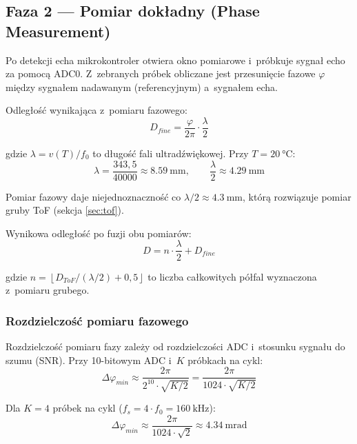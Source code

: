 \documentclass[a4paper,11pt]{article}
\begin{document}
\subsection{Faza 2 --- Pomiar dokładny (Phase Measurement)}
\label{sec:phase}

Po detekcji echa mikrokontroler otwiera okno pomiarowe i~próbkuje sygnał
echo za pomocą ADC0. Z~zebranych próbek obliczane jest przesunięcie fazowe
$\varphi$ między sygnałem nadawanym (referencyjnym) a~sygnałem echa.

Odległość wynikająca z~pomiaru fazowego:
\begin{equation}
    D_{fine} = \frac{\varphi}{2\pi} \cdot \frac{\lambda}{2}
    \label{eq:phase}
\end{equation}

gdzie $\lambda = v(T) / f_0$ to długość fali ultradźwiękowej. Przy
$T = \SI{20}{\celsius}$:
\begin{equation}
    \lambda = \frac{343{,}5}{40000} \approx \SI{8,59}{\milli\metre}, \qquad
    \frac{\lambda}{2} \approx \SI{4,29}{\milli\metre}
    \label{eq:lambda}
\end{equation}

Pomiar fazowy daje niejednoznaczność co $\lambda/2 \approx \SI{4,3}{\milli\metre}$,
którą rozwiązuje pomiar gruby ToF (sekcja \ref{sec:tof}).

Wynikowa odległość po fuzji obu pomiarów:
\begin{equation}
    \boxed{D = n \cdot \frac{\lambda}{2} + D_{fine}}
    \label{eq:wynik}
\end{equation}

gdzie $n = \left\lfloor D_{ToF} / (\lambda/2) + 0{,}5 \right\rfloor$ to liczba
całkowitych półfal wyznaczona z~pomiaru grubego.

\subsubsection{Rozdzielczość pomiaru fazowego}

Rozdzielczość pomiaru fazy zależy od rozdzielczości ADC i~stosunku sygnału
do szumu (SNR). Przy 10-bitowym ADC i~$K$ próbkach na cykl:
\begin{equation}
    \Delta\varphi_{min} \approx \frac{2\pi}{2^{10} \cdot \sqrt{K/2}} = \frac{2\pi}{1024 \cdot \sqrt{K/2}}
    \label{eq:phase_res}
\end{equation}

Dla $K = 4$ próbek na cykl ($f_s = 4 \cdot f_0 = \SI{160}{\kilo\hertz}$):
\begin{equation}
    \Delta\varphi_{min} \approx \frac{2\pi}{1024 \cdot \sqrt{2}} \approx \SI{4,34}{\milli\radian}
\end{equation}
\end{document}
